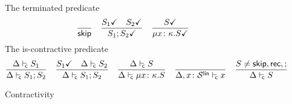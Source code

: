 \begin{figure}[tp]
  The terminated predicate \hfill{}
  \begin{equation*}
    \frac{}{\mathsf{skip}}
    \quad
    \frac{
      {S_1}\checkmark
      \quad
      {S_2}\checkmark
    }{
      {S_1;S_2}\checkmark
    }
    \quad
    \frac{
      {S}\checkmark
    }{
      {\mu{x\colon\kappa}.{S}}\checkmark
}
  \end{equation*}
  The is-contractive predicate \hfill{}
  \begin{equation*}
    \frac{
      \isContr{S_1}
    }{
      \isContr{S_1;S_2}
    }
    \quad
    \frac{
      \isDone{S_1}
      \quad
      \isContr{S_2}
    }{
      \isContr{S_1;S_2}
    }
    \quad
    \frac{
      \isContr S
    }{
      \isContr{\rect{x\colon\kind}S}
    }
    \quad
    \frac{}{
      \isContr[\Delta,x\colon\kindk\kinds\link] x
    }
    \quad
    \frac{
      S\neq\skipt, \reck, ;
    }{
      \isContr S
    }
  \end{equation*}
  \caption{Contractivity}
  \label{fig:contractivity}
\end{figure}



